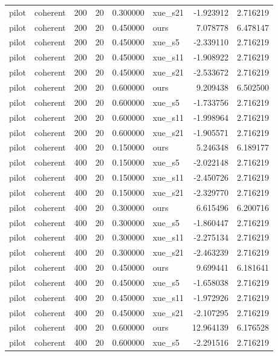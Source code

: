 \begin{longtable}{llrrrlrr}
pilot & coherent & 200 & 20 & 0.300000 & xue\_s21 & -1.923912 & 2.716219 \\
pilot & coherent & 200 & 20 & 0.450000 & ours & 7.078778 & 6.478147 \\
pilot & coherent & 200 & 20 & 0.450000 & xue\_s5 & -2.339110 & 2.716219 \\
pilot & coherent & 200 & 20 & 0.450000 & xue\_s11 & -1.908922 & 2.716219 \\
pilot & coherent & 200 & 20 & 0.450000 & xue\_s21 & -2.533672 & 2.716219 \\
pilot & coherent & 200 & 20 & 0.600000 & ours & 9.209438 & 6.502500 \\
pilot & coherent & 200 & 20 & 0.600000 & xue\_s5 & -1.733756 & 2.716219 \\
pilot & coherent & 200 & 20 & 0.600000 & xue\_s11 & -1.998964 & 2.716219 \\
pilot & coherent & 200 & 20 & 0.600000 & xue\_s21 & -1.905571 & 2.716219 \\
pilot & coherent & 400 & 20 & 0.150000 & ours & 5.246348 & 6.189177 \\
pilot & coherent & 400 & 20 & 0.150000 & xue\_s5 & -2.022148 & 2.716219 \\
pilot & coherent & 400 & 20 & 0.150000 & xue\_s11 & -2.450726 & 2.716219 \\
pilot & coherent & 400 & 20 & 0.150000 & xue\_s21 & -2.329770 & 2.716219 \\
pilot & coherent & 400 & 20 & 0.300000 & ours & 6.615496 & 6.200716 \\
pilot & coherent & 400 & 20 & 0.300000 & xue\_s5 & -1.860447 & 2.716219 \\
pilot & coherent & 400 & 20 & 0.300000 & xue\_s11 & -2.275134 & 2.716219 \\
pilot & coherent & 400 & 20 & 0.300000 & xue\_s21 & -2.463239 & 2.716219 \\
pilot & coherent & 400 & 20 & 0.450000 & ours & 9.699441 & 6.181641 \\
pilot & coherent & 400 & 20 & 0.450000 & xue\_s5 & -1.658038 & 2.716219 \\
pilot & coherent & 400 & 20 & 0.450000 & xue\_s11 & -1.972926 & 2.716219 \\
pilot & coherent & 400 & 20 & 0.450000 & xue\_s21 & -2.107295 & 2.716219 \\
pilot & coherent & 400 & 20 & 0.600000 & ours & 12.964139 & 6.176528 \\
pilot & coherent & 400 & 20 & 0.600000 & xue\_s5 & -2.291516 & 2.716219 \\

\end{longtable}
